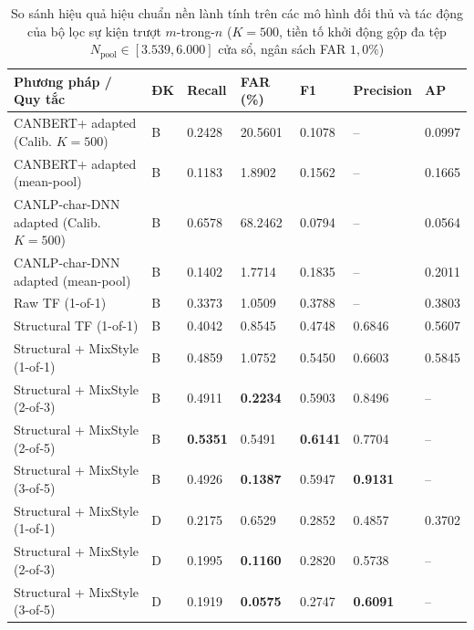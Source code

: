 \documentclass[12pt, a4paper, reqno, oneside]{book}
\begin{document}
{\renewcommand{\arraystretch}{0.84}
\begin{table}[htbp]\centering\footnotesize\setlength{\tabcolsep}{4pt}
\caption[Đối chứng hiệu chuẩn nền lành tính cho đối thủ và bộ lọc sự kiện $m$-trong-$n$]{So sánh hiệu quả hiệu chuẩn nền lành tính trên các mô hình đối thủ và tác động của bộ lọc sự kiện trượt $m$-trong-$n$ ($K=500$, tiền tố khởi động gộp đa tệp $N_{\text{pool}} \in [3.539, 6.000]$ cửa sổ, ngân sách FAR $1{,}0\%$)}\label{tab:cal-baselines-mofn}
\begin{tabular}{P{4.2cm}P{0.9cm}P{1.6cm}P{1.6cm}P{1.6cm}P{1.65cm}P{1.3cm}}
\toprule
Phương pháp / Quy tắc & ĐK & Recall & FAR (\%) & F1 & Precision & AP\\\midrule
CANBERT+ adapted (Calib. $K=500$) & B & 0.2428 & 20.5601 & 0.1078 & -- & 0.0997\\
CANBERT+ adapted (mean-pool) & B & 0.1183 & 1.8902 & 0.1562 & -- & 0.1665\\
CANLP-char-DNN adapted (Calib. $K=500$) & B & 0.6578 & 68.2462 & 0.0794 & -- & 0.0564\\
CANLP-char-DNN adapted (mean-pool) & B & 0.1402 & 1.7714 & 0.1835 & -- & 0.2011\\
Raw TF (1-of-1) & B & 0.3373 & 1.0509 & 0.3788 & -- & 0.3803\\
Structural TF (1-of-1) & B & 0.4042 & 0.8545 & 0.4748 & 0.6846 & 0.5607\\
Structural + MixStyle (1-of-1) & B & 0.4859 & 1.0752 & 0.5450 & 0.6603 & 0.5845\\
Structural + MixStyle (2-of-3) & B & 0.4911 & \textbf{0.2234} & 0.5903 & 0.8496 & --\\
Structural + MixStyle (2-of-5) & B & \textbf{0.5351} & 0.5491 & \textbf{0.6141} & 0.7704 & --\\
Structural + MixStyle (3-of-5) & B & 0.4926 & \textbf{0.1387} & 0.5947 & \textbf{0.9131} & --\\
\midrule
Structural + MixStyle (1-of-1) & D & 0.2175 & 0.6529 & 0.2852 & 0.4857 & 0.3702\\
Structural + MixStyle (2-of-3) & D & 0.1995 & \textbf{0.1160} & 0.2820 & 0.5738 & --\\
Structural + MixStyle (3-of-5) & D & 0.1919 & \textbf{0.0575} & 0.2747 & \textbf{0.6091} & --\\
\bottomrule\end{tabular}
\end{table}}
\end{document}
